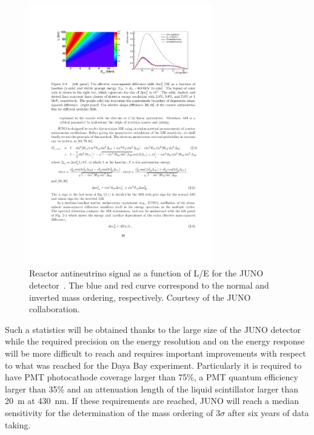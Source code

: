 \begin{figure} [htbp!]
\begin{center}
\includegraphics[width=8cm]{figures/JUNO_spectrum.pdf}
\caption{\label{fig:junospectrum} Reactor antineutrino signal as a function of L/E for the JUNO detector~\cite{An:2015jdp}. The blue and red curve correspond to the normal and inverted mass ordering, respectively. Courtesy of the JUNO collaboration.}
\end{center}
\end{figure}

Such a statistics will be obtained thanks to the large size of the JUNO detector while the required precision on the energy resolution and on the energy response will be more difficult to reach and requires important improvements with respect to what was reached for the Daya Bay experiment. Particularly it is required to have PMT photocathode coverage larger than 75\%, a PMT quantum efficiency larger than 35\% and an attenuation length of the liquid scintillator larger than 20~m at 430~nm. If these requirements are reached, JUNO will reach a median sensitivity for the determination of the mass ordering of $3\sigma$ after six years of data taking. 

